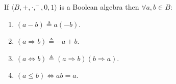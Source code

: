 If $\langle B, +, \cdot, ^-, 0, 1 \rangle$ is a Boolean algebra then $\forall a, b \in B$:
\begin{enumerate}
\item $(a - b) \triangleq a(-b)$.
\item $(a \Rightarrow b) \triangleq -a + b$.
\item $(a \Leftrightarrow b) \triangleq (a \Rightarrow b)(b \Rightarrow a)$.
\item $(a \leq b) \Leftrightarrow ab = a$.
\end{enumerate}
